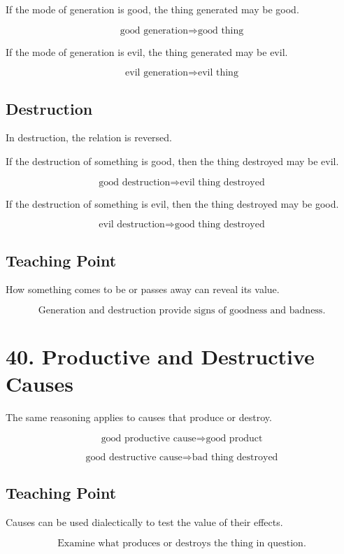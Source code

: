 \documentclass[12pt]{article}
\begin{document}
If the mode of generation is good, the thing generated may be good.

\[
\text{good generation} \Rightarrow \text{good thing}
\]

If the mode of generation is evil, the thing generated may be evil.

\[
\text{evil generation} \Rightarrow \text{evil thing}
\]

\subsection*{Destruction}

In destruction, the relation is reversed.

If the destruction of something is good, then the thing destroyed may be evil.

\[
\text{good destruction} \Rightarrow \text{evil thing destroyed}
\]

If the destruction of something is evil, then the thing destroyed may be good.

\[
\text{evil destruction} \Rightarrow \text{good thing destroyed}
\]

\subsection*{Teaching Point}

How something comes to be or passes away can reveal its value.

\[
\boxed{
\text{Generation and destruction provide signs of goodness and badness.}
}
\]

\section*{40. Productive and Destructive Causes}

The same reasoning applies to causes that produce or destroy.

\[
\text{good productive cause} \Rightarrow \text{good product}
\]

\[
\text{good destructive cause} \Rightarrow \text{bad thing destroyed}
\]

\subsection*{Teaching Point}

Causes can be used dialectically to test the value of their effects.

\[
\boxed{
\text{Examine what produces or destroys the thing in question.}
}
\]
\end{document}
